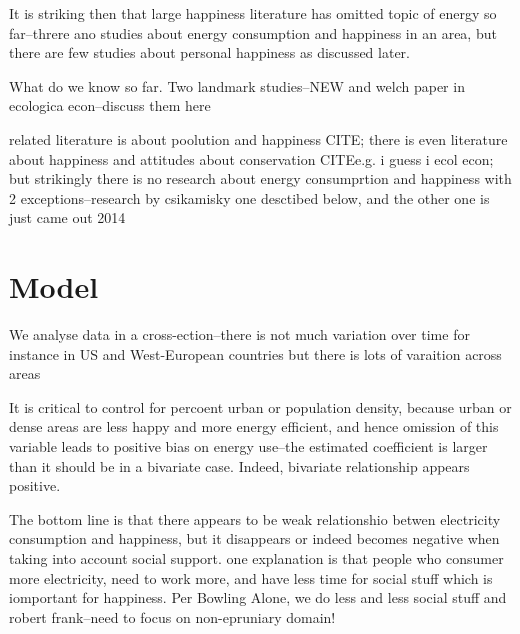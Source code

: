 \documentclass[10pt, letterpaper]{article}
\begin{document}
\begin{spacing}{1.4}
It is striking then that large happiness literature has omitted topic of energy
so far--threre ano studies about energy consumption and happiness in an area,
but there are few studies about personal happiness as discussed later.

What do we know so far. Two landmark studies--NEW and welch paper in ecologica
econ--discuss them here

related literature is about poolution and happiness CITE; there is even
literature about happiness and attitudes about conservation CITEe.g. i guess i
ecol econ; but strikingly there is no research about energy consumprtion and
happiness with 2 exceptions--research by csikamisky one desctibed below, and the
other one is just came out 2014


\section{Model}

We analyse data in a cross-ection--there is not much variation over time for
instance in US and West-European countries %
 but there is lots of varaition across areas

It is critical to control for percoent urban or population density, because
urban or dense areas are less happy and more energy efficient, and hence
omission of this variable leads to positive bias on energy use--the estimated
coefficient   is larger than it should be in a bivariate case. Indeed, bivariate
relationship appears positive. 

The bottom line is that there appears to be weak relationshio betwen electricity
consumption and happiness, but it disappears or indeed becomes negative when
taking into account social support. one explanation is that people who consumer
more electricity, need to work more, and have less time for social stuff which
is iomportant for happiness. Per Bowling Alone, we do less and less social stuff
and robert frank--need to focus on non-epruniary domain!






\end{spacing}
\end{document}
